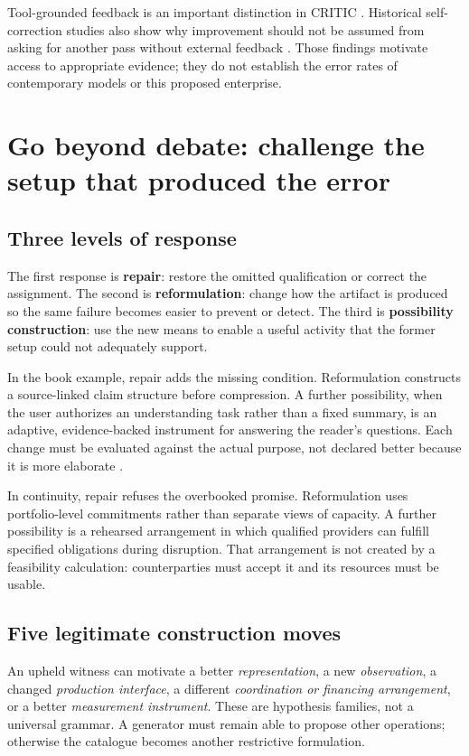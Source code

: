 \documentclass[11pt,a4paper]{article}
\newcommand{\term}[1]{\textbf{#1}}
\begin{document}
Tool-grounded feedback is an important distinction in CRITIC \cite{gou}. Historical self-correction studies also show why improvement should not be assumed from asking for another pass without external feedback \cite{huang}. Those findings motivate access to appropriate evidence; they do not establish the error rates of contemporary models or this proposed enterprise.

\section{Go beyond debate: challenge the setup that produced the error}
\subsection{Three levels of response}
The first response is \term{repair}: restore the omitted qualification or correct the assignment. The second is \term{reformulation}: change how the artifact is produced so the same failure becomes easier to prevent or detect. The third is \term{possibility construction}: use the new means to enable a useful activity that the former setup could not adequately support.

In the book example, repair adds the missing condition. Reformulation constructs a source-linked claim structure before compression. A further possibility, when the user authorizes an understanding task rather than a fixed summary, is an adaptive, evidence-backed instrument for answering the reader's questions. Each change must be evaluated against the actual purpose, not declared better because it is more elaborate \cite[App.~C]{ti}.

In continuity, repair refuses the overbooked promise. Reformulation uses portfolio-level commitments rather than separate views of capacity. A further possibility is a rehearsed arrangement in which qualified providers can fulfill specified obligations during disruption. That arrangement is not created by a feasibility calculation: counterparties must accept it and its resources must be usable.

\subsection{Five legitimate construction moves}
An upheld witness can motivate a better \emph{representation}, a new \emph{observation}, a changed \emph{production interface}, a different \emph{coordination or financing arrangement}, or a better \emph{measurement instrument}. These are hypothesis families, not a universal grammar. A generator must remain able to propose other operations; otherwise the catalogue becomes another restrictive formulation.
\end{document}
